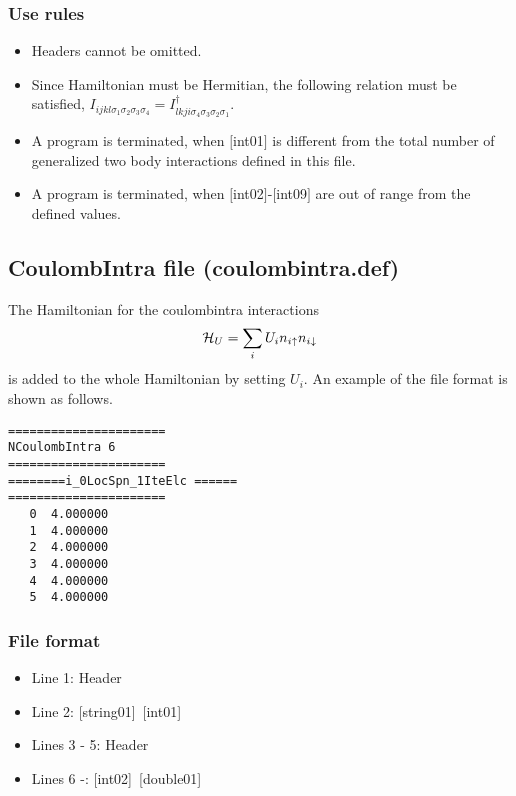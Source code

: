 \subsubsection{Use rules}
\begin{itemize}
\item Headers cannot be omitted. 
\item Since Hamiltonian must be Hermitian, the following relation must be satisfied, $I_{ijkl\sigma_1\sigma_2\sigma_3\sigma_4}=I_{lkji\sigma_4\sigma_3\sigma_2\sigma_1}^{\dag}$. 
\item A program is terminated, when $[$int01$]$ is different from the total number of generalized two body interactions defined in this file.
\item A program is terminated, when $[$int02$]$-$[$int09$]$ are out of range from the defined values.
\end{itemize}

\newpage
\subsection{CoulombIntra file (coulombintra.def)}
The Hamiltonian for the coulombintra interactions
\begin{equation}
{\cal H}_U =\sum_{i}U_i n_ {i \uparrow}n_{i \downarrow}
\end{equation}
is added to the whole Hamiltonian by setting $U_i$.
An example of the file format is shown as follows.

\begin{minipage}{12.5cm}
\begin{screen}
\begin{verbatim}
====================== 
NCoulombIntra 6  
====================== 
========i_0LocSpn_1IteElc ====== 
====================== 
   0  4.000000
   1  4.000000
   2  4.000000
   3  4.000000
   4  4.000000
   5  4.000000
\end{verbatim}
\end{screen}
\end{minipage}

\subsubsection{File format}
 \begin{itemize}
   \item  Line 1:  Header
   \item  Line 2:   [string01]~[int01]
   \item  Lines 3 - 5:  Header
   \item  Lines 6 -:  [int02]~[double01] 
  \end{itemize}
